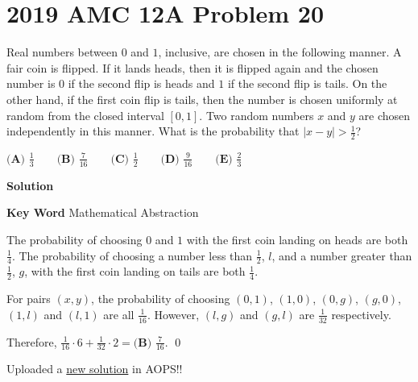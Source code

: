 \documentclass{article}
\newenvironment{solution}{\begin{trivlist}\item[]{\bf Solution}}{\qed \end{trivlist}}
\begin{document}
\section*{2019 AMC 12A Problem 20}
Real numbers between $0$ and $1$, inclusive, are chosen in the following manner. A fair coin is flipped. If it lands heads, then it is flipped again and the chosen number is $0$ if the second flip is heads and $1$ if the second flip is tails. On the other hand, if the first coin flip is tails, then the number is chosen uniformly at random from the closed interval $[0,1]$. Two random numbers $x$ and $y$ are chosen independently in this manner. What is the probability that $|x-y| > \tfrac{1}{2}$?

$\textbf{(A) } \frac{1}{3} \qquad \textbf{(B) } \frac{7}{16} \qquad \textbf{(C) } \frac{1}{2} \qquad \textbf{(D) } \frac{9}{16} \qquad \textbf{(E) } \frac{2}{3}$

\begin{solution}

\textbf{Key Word} Mathematical Abstraction

The probability of choosing $0$ and $1$ with the first coin landing on heads are both $\frac{1}{4}$. The probability of choosing a number less than $\frac{1}{2}$, $l$, and a number greater than $\frac{1}{2}$, $g$, with the first coin landing on tails are both $\frac{1}{4}$.

For pairs $(x, y)$, the probability of choosing $(0, 1)$, $(1, 0)$, $(0, g)$, $(g, 0)$, $(1, l)$ and $(l, 1)$ are all $\frac{1}{16}$. However, $(l, g)$ and $(g, l)$ are $\frac{1}{32}$ respectively.

Therefore, $\frac{1}{16} \cdot 6 + \frac{1}{32} \cdot 2 = \boxed{\textbf{(B) } \frac{7}{16}}$.
\end{solution}
Uploaded a \href{https://artofproblemsolving.com/wiki/index.php/2019_AMC_10A_Problems/Problem_22#Solution_5}{new solution} in AOPS!! \\
\end{document}
